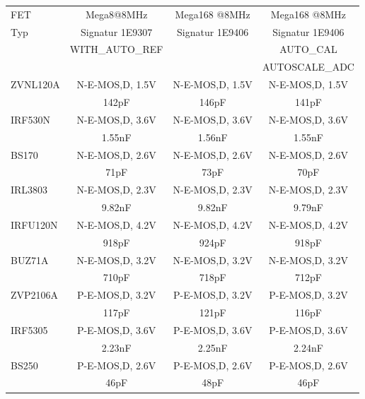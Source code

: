 \begin{table}[H]
  \begin{center}
    \begin{tabular}{| l | c | c | c |}
    \hline
     FET     & Mega8@8MHz       & Mega168 @8MHz    & Mega168 @8MHz \\
    Typ      & Signatur 1E9307  & Signatur 1E9406  & Signatur 1E9406 \\
             & WITH\_AUTO\_REF  &                  & AUTO\_CAL \\
             &                  &                  & AUTOSCALE\_ADC \\
    \hline
    \hline
ZVNL120A     & N-E-MOS,D, 1.5V  & N-E-MOS,D, 1.5V  & N-E-MOS,D, 1.5V \\
             & 142pF            & 146pF            & 141pF \\
    \hline
IRF530N      & N-E-MOS,D, 3.6V  & N-E-MOS,D, 3.6V  & N-E-MOS,D, 3.6V \\
             & 1.55nF           & 1.56nF           & 1.55nF \\
    \hline
BS170        & N-E-MOS,D, 2.6V  & N-E-MOS,D, 2.6V  & N-E-MOS,D, 2.6V \\
             &  71pF            &  73pF            &  70pF \\
    \hline
IRL3803      & N-E-MOS,D, 2.3V  & N-E-MOS,D, 2.3V  & N-E-MOS,D, 2.3V \\
             & 9.82nF           & 9.82nF           & 9.79nF \\
    \hline
IRFU120N     & N-E-MOS,D, 4.2V  & N-E-MOS,D, 4.2V  & N-E-MOS,D, 4.2V \\
             & 918pF            & 924pF            & 918pF \\
    \hline
BUZ71A       & N-E-MOS,D, 3.2V  & N-E-MOS,D, 3.2V  & N-E-MOS,D, 3.2V \\
             & 710pF            & 718pF            & 712pF \\
    \hline
ZVP2106A     & P-E-MOS,D, 3.2V  & P-E-MOS,D, 3.2V  & P-E-MOS,D, 3.2V \\
             & 117pF            & 121pF            & 116pF \\
    \hline
IRF5305      & P-E-MOS,D, 3.6V  & P-E-MOS,D, 3.6V  & P-E-MOS,D, 3.6V \\
             & 2.23nF           & 2.25nF           & 2.24nF \\
    \hline
BS250        & P-E-MOS,D, 2.6V  & P-E-MOS,D, 2.6V  & P-E-MOS,D, 2.6V \\
             & 46pF             & 48pF             & 46pF \\

\end{tabular}
\end{center}
\end{table}
